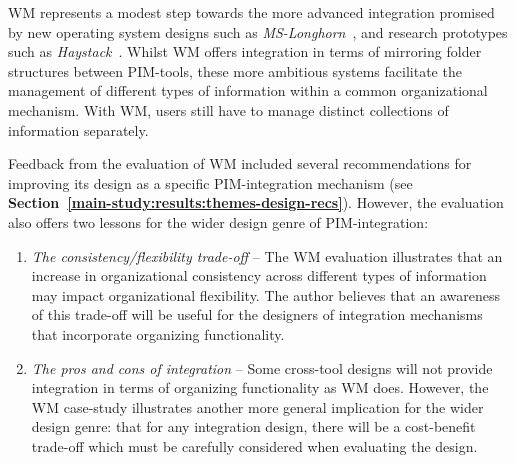 
WM represents a modest step towards the more advanced integration promised by new operating system designs such as \textit{MS-Longhorn}~\citep{winfs:03}, and research prototypes such as \textit{Haystack}~\citep{haystack:99}.  Whilst WM offers integration in terms of mirroring folder structures between PIM-tools, these more ambitious systems facilitate the management of different types of information within a common organizational mechanism.  With WM, users still have to manage distinct collections of information separately. 

Feedback from the evaluation of WM included several recommendations for improving its design as a specific PIM-integration mechanism (see \textbf{Section~\ref{main-study:results:themes-design-recs}}).  However, the evaluation also offers two lessons for the wider design genre of PIM-integration:
\begin{enumerate}

\item \textit{The consistency/flexibility trade-off} -- The WM evaluation illustrates that an increase in organizational consistency across different types of information may impact organizational flexibility.  The author believes that an awareness of this trade-off will be useful for the designers of integration mechanisms that incorporate organizing functionality.

\item \textit{The pros and cons of integration} -- Some cross-tool designs will not provide integration in terms of organizing functionality as WM does.  However, the WM case-study illustrates another more general implication for the wider design genre: that for any integration design, there will be a cost-benefit trade-off which must be carefully considered when evaluating the design. 

\end{enumerate}


